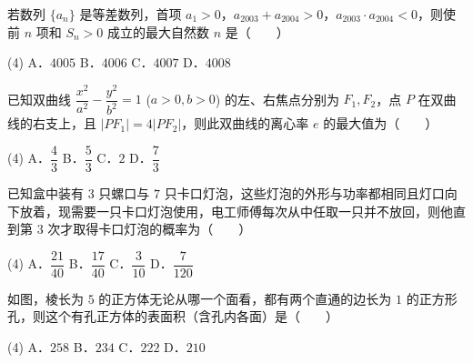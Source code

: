 \begin{question}
若数列 $\{a_n\}$ 是等差数列，首项 $a_1 > 0$，$a_{2003} + a_{2004} > 0$，$a_{2003} \cdot a_{2004} < 0$，则使前 $n$ 项和 $S_n > 0$ 成立的最大自然数 $n$ 是\mbox{（　　）}

\begin{gkopts}(4)
\task A．$4005$
\task B．$4006$
\task C．$4007$
\task D．$4008$
\end{gkopts}

\end{question}
\begin{question}
已知双曲线 $\dfrac{x^2}{a^2} - \dfrac{y^2}{b^2} = 1$ ($a > 0, b > 0$) 的左、右焦点分别为 $F_1, F_2$，点 $P$ 在双曲线的右支上，且 $|PF_1| = 4|PF_2|$，则此双曲线的离心率 $e$ 的最大值为\mbox{（　　）}

\begin{gkopts}(4)
\task A．$\dfrac{4}{3}$
\task B．$\dfrac{5}{3}$
\task C．$2$
\task D．$\dfrac{7}{3}$
\end{gkopts}

\end{question}
\begin{question}
已知盒中装有 $3$ 只螺口与 $7$ 只卡口灯泡，这些灯泡的外形与功率都相同且灯口向下放着，现需要一只卡口灯泡使用，电工师傅每次从中任取一只并不放回，则他直到第 $3$ 次才取得卡口灯泡的概率为\mbox{（　　）}

\begin{gkopts}(4)
\task A．$\dfrac{21}{40}$
\task B．$\dfrac{17}{40}$
\task C．$\dfrac{3}{10}$
\task D．$\dfrac{7}{120}$
\end{gkopts}

\Needspace{0.4\textheight}
\end{question}
\begin{question}
如图，棱长为 $5$ 的正方体无论从哪一个面看，都有两个直通的边长为 $1$ 的正方形孔，则这个有孔正方体的表面积（含孔内各面）是\mbox{（　　）}
\nopagebreak[4]
\begin{center}\end{center}
\nopagebreak[4]
\begin{gkopts}(4)
\task A．$258$
\task B．$234$
\task C．$222$
\task D．$210$
\end{gkopts}

\end{question}

